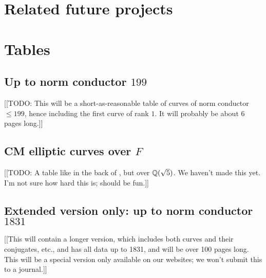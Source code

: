\documentclass{amsart}
\begin{document}
\section{Related future projects}\label{sec:future}

\section{Tables}\label{sec:tables}

\subsection{Up to norm conductor  $199$}\label{sec:to199}

[[TODO: This will be a short-as-reasonable table of curves of norm
conductor $\leq 199$, hence including the first curve of rank $1$.  It
will probably be about 6 pages long.]]

\subsection{CM elliptic curves over $F$}\label{sec:cm}

[[TODO: A table like in the back of \cite{silverman:aec2}, but over
$\mathbb{Q}(\sqrt{5})$.  We haven't made this yet.  I'm not sure how hard this
is; should be fun.]]

\subsection{Extended version only: up to norm conductor  $1831$}\label{sec:to1831}

[[This will contain a longer version, which includes both curves and
their conjugates, etc., and has all data up to 1831, and will be over
100 pages long.  This will be a special version only available on our
websites; we won't submit this to a journal.]]




\end{document}
